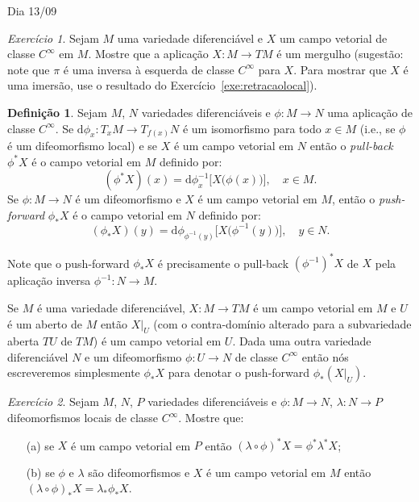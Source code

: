 \documentclass[oneside,11pt]{amsart}
\newcommand{\dd}{\mathrm d}
\theoremstyle{remark}\newtheorem{exercise}{Exercício}[section]
\theoremstyle{plain}\newtheorem{teo}{Teorema}[section]
\theoremstyle{plain}\newtheorem{lem}[teo]{Lema}
\theoremstyle{plain}\newtheorem{prop}[teo]{Proposição}
\theoremstyle{definition}\newtheorem{defin}[teo]{Definição}
\theoremstyle{remark}\newtheorem{rem}[teo]{Observação}
\theoremstyle{definition}\newtheorem{example}[teo]{Exemplo}
\numberwithin{equation}{section}
\begin{document}
\begin{section}{Dia 13/09}
\begin{exercise}
Sejam $M$ uma variedade diferenciável e $X$ um campo vetorial de classe $C^\infty$ em $M$. Mostre que a aplicação $X:M\to TM$ é um mergulho
(sugestão: note que $\pi$ é uma inversa à esquerda de classe $C^\infty$ para $X$. Para mostrar que $X$ é uma imersão, use o resultado do Exercício~\ref{exe:retracaolocal}).
\end{exercise}

\begin{defin}\label{thm:defpullbackvecfield}
Sejam $M$, $N$ variedades diferenciáveis e $\phi:M\to N$ uma aplicação de classe $C^\infty$. Se $\dd\phi_x:T_xM\to T_{f(x)}N$ é um isomorfismo para todo $x\in M$
(i.e., se $\phi$ é um difeomorfismo local) e se $X$ é um campo vetorial em $N$ então o {\em pull-back\/} $\phi^*X$ é o campo vetorial em $M$ definido por:
\[(\phi^*X)(x)=\dd\phi_x^{-1}\big[X\big(\phi(x)\big)\big],\quad x\in M.\]
Se $\phi:M\to N$ é um difeomorfismo e $X$ é um campo vetorial em $M$, então o {\em push-forward\/} $\phi_*X$ é o campo vetorial em $N$ definido por:
\[(\phi_*X)(y)=\dd\phi_{\phi^{-1}(y)}\big[X\big(\phi^{-1}(y)\big)\big],\quad y\in N.\]
\end{defin}
Note que o push-forward $\phi_*X$ é precisamente o pull-back $(\phi^{-1})^*X$ de $X$ pela aplicação inversa $\phi^{-1}:N\to M$.

\smallskip

Se $M$ é uma variedade diferenciável, $X:M\to TM$ é um campo vetorial em $M$ e $U$ é um aberto de $M$ então $X\vert_U$ (com o contra-domínio
alterado para a subvariedade aberta $TU$ de $TM$) é um campo vetorial em $U$. Dada uma outra variedade diferenciável $N$ e um difeomorfismo $\phi:U\to N$
de classe $C^\infty$ então nós escreveremos simplesmente $\phi_*X$ para denotar o push-forward $\phi_*(X\vert_U)$.

\begin{exercise}\label{exe:pbpscampos}
Sejam $M$, $N$, $P$ variedades diferenciáveis e $\phi:M\to N$, $\lambda:N\to P$ difeomorfismos locais de classe $C^\infty$. Mostre que:
\begin{itemize}
\item[(a)] se $X$ é um campo vetorial em $P$ então $(\lambda\circ\phi)^*X=\phi^*\lambda^*X$;
\item[(b)] se $\phi$ e $\lambda$ são difeomorfismos e $X$ é um campo vetorial em $M$ então $(\lambda\circ\phi)_*X=\lambda_*\phi_*X$.
\end{itemize}
\end{exercise}


\end{section}
\end{document}
